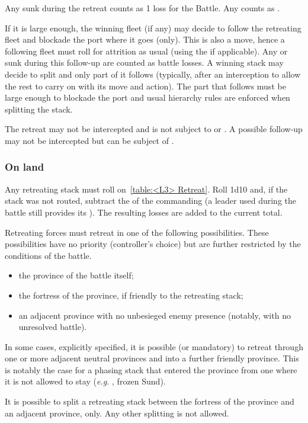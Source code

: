 Any \ND sunk during the retreat counts as 1 loss for the Battle. Any \NDE
counts as \texttu.

If it is large enough, the winning fleet (if any) may decide to follow the
retreating fleet and blockade the port where it goes (only). This is also a
move, hence a following fleet must roll for attrition as usual (using the
 \LeaderA if applicable). Any \ND or \NDE sunk during this
follow-up are counted as battle losses. A winning stack may decide to split
and only part of it follows (typically, after an interception to allow the
rest to carry on with its move and action). The part that follows must be
large enough to blockade the port and usual hierarchy rules are enforced when
splitting the stack.

The retreat may not be intercepted and is not subject to \Presidios or
\StraitFort. A possible follow-up may not be intercepted but can be subject of
\StraitFort.

\subsubsection{On land}

Any retreating stack must roll on~\ref{table:<L3> Retreat}. Roll 1d10 and, if
the stack was not routed, subtract the \Man of the commanding \LeaderG (a
 leader used during the battle still provides its
\Man). The resulting losses are added to the current total.

Retreating forces must retreat in one of the following possibilities. These
possibilities have no priority (controller's choice) but are further
restricted by the conditions of the battle.
\begin{itemize}
\item the province of the battle itself;
\item the fortress of the province, if friendly to the retreating stack;
\item an adjacent province with no unbesieged enemy presence (notably, with no
  unresolved battle).
\end{itemize}

In some cases, explicitly specified, it is possible (or mandatory) to retreat
through one or more adjacent neutral provinces and into a further friendly
province. This is notably the case for a phasing stack that entered the
province from one where it is not allowed to stay (\emph{e.g.} \HRE, frozen
Sund).

It is possible to split a retreating stack between the fortress of the
province and an adjacent province, only. Any other splitting is not allowed.


